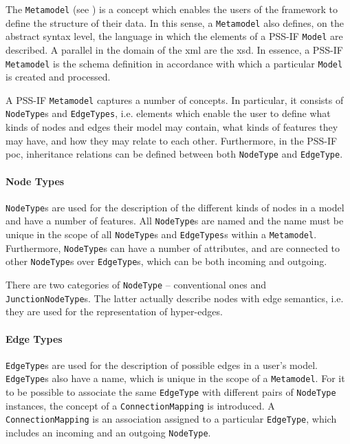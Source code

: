 The \texttt{Metamodel} (see ) is a concept which enables the users of the framework to define the structure of their data. In this sense, a \texttt{Metamodel} also defines, on the abstract syntax level, the language in which the elements of a PSS-IF \texttt{Model} are described. A parallel in the domain of the \gls{xml} are the \gls{xsd}. In essence, a PSS-IF \texttt{Metamodel} is the schema definition in accordance with which a particular \texttt{Model} is created and processed.

A PSS-IF \texttt{Metamodel} captures a number of concepts. In particular, it consists of \texttt{NodeType}s and \texttt{EdgeTypes}, i.e. elements which enable the user to define what kinds of nodes and edges their model may contain, what kinds of features they may have, and how they may relate to each other. Furthermore, in the PSS-IF \gls{poc}, inheritance relations can be defined between both \texttt{NodeType} and \texttt{EdgeType}.

\paragraph{Node Types}

\texttt{NodeType}s are used for the description of the different kinds of nodes in a model and have a number of features. All \texttt{NodeType}s are named and the name must be unique in the scope of all \texttt{NodeType}s and \texttt{EdgeTypes}s within a \texttt{Metamodel}. Furthermore, \texttt{NodeType}s can have a number of attributes, and are connected to other \texttt{NodeType}s over \texttt{EdgeType}s, which can be both incoming and outgoing.

There are two categories of \texttt{NodeType} -- conventional ones and \texttt{JunctionNodeType}s. The latter actually describe nodes with edge semantics, i.e. they are used for the representation of hyper-edges.

\paragraph{Edge Types}

\texttt{EdgeType}s are used for the description of possible edges in a user's model. \texttt{EdgeType}s also have a name, which is unique in the scope of a \texttt{Metamodel}. For it to be possible to associate the same \texttt{EdgeType} with different pairs of \texttt{NodeType} instances, the concept of a \texttt{ConnectionMapping} is introduced. A \texttt{ConnectionMapping} is an association assigned to a particular \texttt{EdgeType}, which includes an incoming and an outgoing \texttt{NodeType}.

